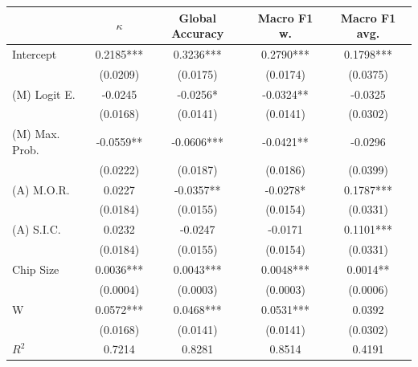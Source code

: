 \begin{table}
        \centering
\begin{tabular}{lcccc}
\toprule
{} &    $\kappa$ & Global Accuracy & Macro F1 w. & Macro F1 avg. \\
\midrule
Intercept                                         &  0.2185*** &        0.3236*** &    0.2790*** &      0.1798*** \\
                                                  &   (0.0209) &         (0.0175) &     (0.0174) &       (0.0375) \\
(M) Logit E.                                       &    -0.0245 &         -0.0256* &    -0.0324** &        -0.0325 \\
                                                  &   (0.0168) &         (0.0141) &     (0.0141) &       (0.0302) \\
(M) Max. Prob.                                     &  -0.0559** &       -0.0606*** &    -0.0421** &        -0.0296 \\
                                                  &   (0.0222) &         (0.0187) &     (0.0186) &       (0.0399) \\
(A) M.O.R.                                         &     0.0227 &        -0.0357** &     -0.0278* &      0.1787*** \\
                                                  &   (0.0184) &         (0.0155) &     (0.0154) &       (0.0331) \\
(A) S.I.C.                                         &     0.0232 &          -0.0247 &      -0.0171 &      0.1101*** \\
                                                  &   (0.0184) &         (0.0155) &     (0.0154) &       (0.0331) \\
Chip Size                                         &  0.0036*** &        0.0043*** &    0.0048*** &       0.0014** \\
                                                  &   (0.0004) &         (0.0003) &     (0.0003) &       (0.0006) \\
W                                                 &  0.0572*** &        0.0468*** &    0.0531*** &         0.0392 \\
                                                  &   (0.0168) &         (0.0141) &     (0.0141) &       (0.0302) \\
\midrule
$R^2$                                             &     0.7214 &           0.8281 &       0.8514 &         0.4191 \\

\end{tabular}
\end{table}
